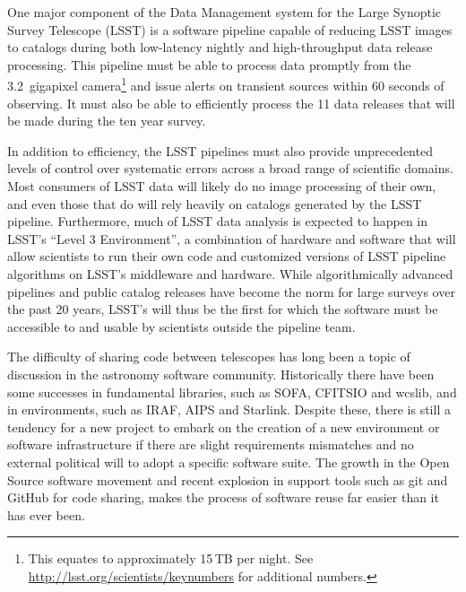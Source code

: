 \documentclass[]{spie}  %
\begin{document}
One major component of the Data Management system\cite{2016_adassxxv_O3-1} for the Large Synoptic Survey Telescope (LSST)\cite{2008arXiv0805.2366I,2016SPIE-Kahn,2014SPIE.9145E..1AG} is a software pipeline capable of reducing LSST images to catalogs during both low-latency nightly and high-throughput data release processing.
This pipeline must be able to process data promptly from the 3.2~gigapixel camera\footnote{This equates to approximately 15\,TB per night. See \url{http://lsst.org/scientists/keynumbers} for additional numbers.} and issue alerts on transient sources within 60 seconds of observing.
It must also be able to efficiently process the 11 data releases that will be made during the ten year survey.

In addition to efficiency, the LSST pipelines must also provide unprecedented levels of control over systematic errors across a broad range of scientific domains.
Most consumers of LSST data will likely do no image processing of their own, and even those that do will rely heavily on catalogs generated by the LSST pipeline.
Furthermore, much of LSST data analysis is expected to happen in LSST's ``Level 3 Environment'', a combination of hardware and software that will allow scientists to run their own code and customized versions of LSST pipeline algorithms on LSST's middleware and hardware.
While algorithmically advanced pipelines and public catalog releases have become the norm for large surveys over the past 20 years, LSST's will thus be the first for which the software must be accessible to and usable by scientists outside the pipeline team.

The difficulty of sharing code between telescopes has long been a topic of discussion in the astronomy software community\cite{1998ASPC..145..142M,1999ASPC..172...11E,2001ASSL..266..163S,2002SPIE.4844..321E}.
Historically there have been some successes in fundamental libraries, such as SOFA\cite{2011SchpJ...611404H}, CFITSIO\cite{1999ASPC..172..487P} and wcslib\cite{2011ascl.soft08003C}, and in environments, such as IRAF\cite{1986SPIE..627..733T}, AIPS\cite{1996ASPC..101...37V} and Starlink\cite{1982QJRAS..23..485D}.
Despite these, there is still a tendency for a new project to embark on the creation of a new environment or software infrastructure if there are slight requirements mismatches and no external political will to adopt a specific software suite.
The growth in the Open Source software movement\cite{2006OpenSources} and recent explosion in support tools such as git and GitHub for code sharing\cite{2014IACWSLima}, makes the process of software reuse far easier than it has ever been.
\end{document}
